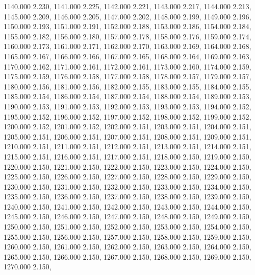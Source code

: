 1140.000 2.230, 
1141.000 2.225, 
1142.000 2.221, 
1143.000 2.217, 
1144.000 2.213, 
1145.000 2.209, 
1146.000 2.205, 
1147.000 2.202, 
1148.000 2.199, 
1149.000 2.196, 
1150.000 2.193, 
1151.000 2.191, 
1152.000 2.188, 
1153.000 2.186, 
1154.000 2.184, 
1155.000 2.182, 
1156.000 2.180, 
1157.000 2.178, 
1158.000 2.176, 
1159.000 2.174, 
1160.000 2.173, 
1161.000 2.171, 
1162.000 2.170, 
1163.000 2.169, 
1164.000 2.168, 
1165.000 2.167, 
1166.000 2.166, 
1167.000 2.165, 
1168.000 2.164, 
1169.000 2.163, 
1170.000 2.162, 
1171.000 2.161, 
1172.000 2.161, 
1173.000 2.160, 
1174.000 2.159, 
1175.000 2.159, 
1176.000 2.158, 
1177.000 2.158, 
1178.000 2.157, 
1179.000 2.157, 
1180.000 2.156, 
1181.000 2.156, 
1182.000 2.155, 
1183.000 2.155, 
1184.000 2.155, 
1185.000 2.154, 
1186.000 2.154, 
1187.000 2.154, 
1188.000 2.154, 
1189.000 2.153, 
1190.000 2.153, 
1191.000 2.153, 
1192.000 2.153, 
1193.000 2.153, 
1194.000 2.152, 
1195.000 2.152, 
1196.000 2.152, 
1197.000 2.152, 
1198.000 2.152, 
1199.000 2.152, 
1200.000 2.152, 
1201.000 2.152, 
1202.000 2.151, 
1203.000 2.151, 
1204.000 2.151, 
1205.000 2.151, 
1206.000 2.151, 
1207.000 2.151, 
1208.000 2.151, 
1209.000 2.151, 
1210.000 2.151, 
1211.000 2.151, 
1212.000 2.151, 
1213.000 2.151, 
1214.000 2.151, 
1215.000 2.151, 
1216.000 2.151, 
1217.000 2.151, 
1218.000 2.150, 
1219.000 2.150, 
1220.000 2.150, 
1221.000 2.150, 
1222.000 2.150, 
1223.000 2.150, 
1224.000 2.150, 
1225.000 2.150, 
1226.000 2.150, 
1227.000 2.150, 
1228.000 2.150, 
1229.000 2.150, 
1230.000 2.150, 
1231.000 2.150, 
1232.000 2.150, 
1233.000 2.150, 
1234.000 2.150, 
1235.000 2.150, 
1236.000 2.150, 
1237.000 2.150, 
1238.000 2.150, 
1239.000 2.150, 
1240.000 2.150, 
1241.000 2.150, 
1242.000 2.150, 
1243.000 2.150, 
1244.000 2.150, 
1245.000 2.150, 
1246.000 2.150, 
1247.000 2.150, 
1248.000 2.150, 
1249.000 2.150, 
1250.000 2.150, 
1251.000 2.150, 
1252.000 2.150, 
1253.000 2.150, 
1254.000 2.150, 
1255.000 2.150, 
1256.000 2.150, 
1257.000 2.150, 
1258.000 2.150, 
1259.000 2.150, 
1260.000 2.150, 
1261.000 2.150, 
1262.000 2.150, 
1263.000 2.150, 
1264.000 2.150, 
1265.000 2.150, 
1266.000 2.150, 
1267.000 2.150, 
1268.000 2.150, 
1269.000 2.150, 
1270.000 2.150, 
